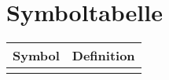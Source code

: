 \section*{Symboltabelle}
\renewcommand{\arraystretch}{1.3}
\begin{table}[h]













	\begin{tabularx}{\textwidth}{p{}p{}}
		\hline
		\textbf{Symbol} & \textbf{Definition} \\
		\hline
		\hline \\


\end{tabularx}
\end{table}
